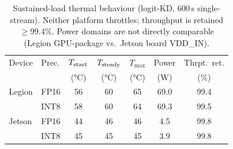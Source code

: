 \begin{table}[t]
\centering
\caption{Sustained-load thermal behaviour (logit-KD, 600\,s single-stream). Neither platform throttles; throughput is retained $\geq$99.4\%. Power domains are not directly comparable (Legion GPU-package vs.\ Jetson board VDD\_IN).}
\label{tab:thermal}
\begin{tabular}{llccccc}
\toprule
Device & Prec. & $T_{\rm start}$ & $T_{\rm steady}$ & $T_{\max}$ & Power & Thrpt.\ ret. \\
 & & (°C) & (°C) & (°C) & (W) & (\%) \\
\midrule
Legion & FP16 & 56 & 60 & 65 & 69.0 & 99.4 \\
 & INT8 & 58 & 60 & 64 & 69.3 & 99.5 \\
\midrule
Jetson & FP16 & 44 & 46 & 46 & 4.5 & 99.8 \\
 & INT8 & 45 & 45 & 45 & 3.9 & 99.8 \\
\bottomrule
\end{tabular}
\end{table}
